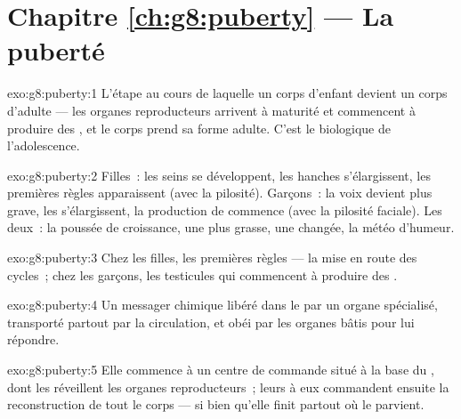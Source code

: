 \section*{Chapitre \ref{ch:g8:puberty} --- La puberté}

\begin{solution}{exo:g8:puberty:1}
L'étape au cours de laquelle un corps d'enfant devient un corps
d'adulte --- les organes reproducteurs arrivent à maturité et
commencent à produire des , et le corps prend sa forme
adulte. C'est le  biologique de l'adolescence.
\end{solution}

\begin{solution}{exo:g8:puberty:2}
Filles~: les seins se développent, les hanches s'élargissent, les
premières règles apparaissent (avec la pilosité). Garçons~: la voix
devient plus grave, les  s'élargissent, la production de
 commence (avec la pilosité faciale). Les deux~: la
poussée de croissance, une  plus grasse, une  changée, la
météo d'humeur.
\end{solution}

\begin{solution}{exo:g8:puberty:3}
Chez les filles, les premières règles --- la mise en route des
cycles~; chez les garçons, les testicules qui commencent à produire
des .
\end{solution}

\begin{solution}{exo:g8:puberty:4}
Un messager chimique libéré dans le  par un organe spécialisé,
transporté partout par la circulation, et obéi par les organes bâtis
pour lui répondre.
\end{solution}

\begin{solution}{exo:g8:puberty:5}
Elle commence à un centre de commande situé à la base du ,
dont les  réveillent les organes reproducteurs~; leurs
 à eux commandent ensuite la reconstruction de tout le corps
--- si bien qu'elle finit partout où le  parvient.
\end{solution}

